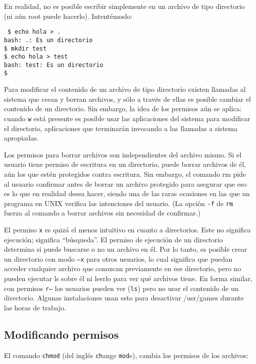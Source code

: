 \documentclass[12pt]{article}
\begin{document}
En realidad, no es posible escribir simplemente en un archivo de tipo 
directorio (ni aún root puede hacerlo). Intentémoslo: 

\texttt{
\$ echo hola > .  \\
bash: .: Es un directorio \\
\$ mkdir test \\
\$ echo hola > test \\
bash: test: Es un directorio \\
\$  
}

Para modificar el contenido de un archivo de tipo directorio existen 
llamadas al sistema que crean y borran archivos, y sólo a través de 
ellas es posible cambiar el contenido de un directorio. Sin embargo, 
la idea de los permisos aún se aplica: cuando {\tt w} está presente 
es posible usar las aplicaciones del sistema para modificar el directorio, 
aplicaciones que terminarán invocando a las llamadas a sistema apropiadas. 

Los permisos para borrar archivos son independientes del archivo mismo. 
Si el usuario tiene permiso de escritura en un directorio, puede borrar 
archivos de él, aún los que estén protegidos contra escritura. Sin 
embargo, el comando rm pide al usuario confirmar antes de borrar
un archivo protegido para asegurar que eso es lo 
que en realidad desea hacer, siendo una de las raras ocasiones en las que 
un programa en UNIX verifica las intenciones del usuario. (La opción {\tt -f} de
{\tt rm } fuerza al comando a borrar archivos sin necesidad de confirmar.)

El permiso {\tt x} es quizá el menos intuitivo en cuanto a directorios. Este no 
significa ejecución; significa ``búsqueda''. El permiso de ejecución de 
un directorio determina si puede buscarse o no un archivo en él. Por lo tanto, 
es posible crear un directorio con modo {\tt --x} para otros usuarios, lo cual 
significa que puedan acceder cualquier archivo que conozcan 
previamente en ese directorio, pero no pueden ejecutar ls sobre él ni leerlo 
para ver qué archivos tiene. En forma similar, con permisos {\tt r--} los 
usuarios pueden ver ({\tt ls}) pero no usar el contenido de un directorio. 
Algunas instalaciones usan esto para desactivar /usr/games durante las horas de trabajo. 


\subsection*{Modificando permisos}
El comando {\tt chmod} (del inglés {\tt ch}ange {\tt mod}e), cambia los 
permisos de los archivos: 
\end{document}
